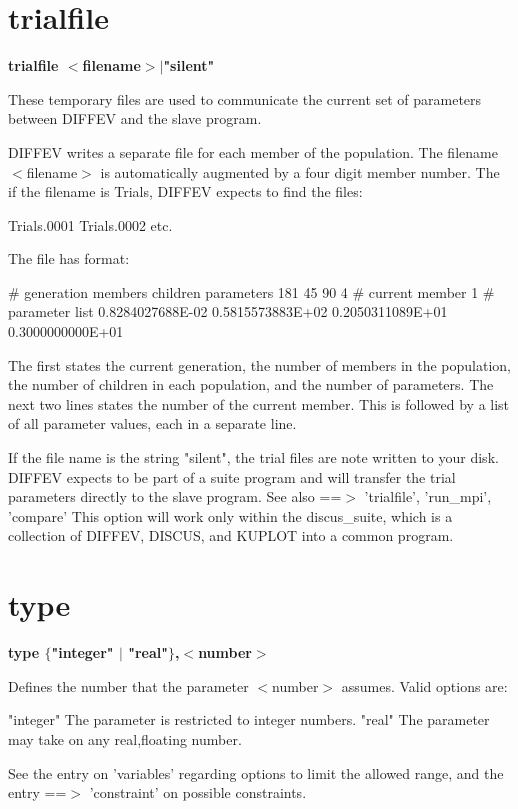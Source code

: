 \section{trialfile}
{\bf trialfile $ <$filename$> $$| $"silent" \par }
\par
\vspace{3pt}
These temporary files are used to communicate the current set of parameters 
between DIFFEV and the slave program. 
\par
DIFFEV writes a separate file for each member of the population. 
The filename $ <$filename$> $ is automatically augmented by a four digit 
member number. The if the filename is Trials, DIFFEV expects to 
find the files: 
\begin{MacVerbatim}
Trials.0001
Trials.0002
etc.
\end{MacVerbatim}
The file has format: 
\par
\begin{MacVerbatim}
# generation members children parameters
     181        45        90         4
# current member
    1
# parameter list
    0.8284027688E-02
    0.5815573883E+02
    0.2050311089E+01
    0.3000000000E+01
\end{MacVerbatim}
The first states the current generation, the number of members in 
the population, the number of children in each population, and the 
number of parameters. 
The next two lines states the number of the current member. 
This is followed by a list of all parameter values, each in a separate 
line. 
\par
If the file name is the string "silent", the trial files are 
note written to your disk. DIFFEV expects to be part of a suite 
program and will transfer the trial parameters directly to the 
slave program. See also ==$> $ 'trialfile', 'run\_mpi', 'compare' 
This option will work only within the discus\_suite, which is a 
collection of DIFFEV, DISCUS, and KUPLOT into a common program. 
\section{type}
{\bf type $ \{$"integer" $| $ "real"$\} $,$ <$number$> $ \par }
\par
\vspace{3pt}
Defines the number that the parameter $ <$number$> $ assumes. Valid options 
are: 
\begin{MacVerbatim}
"integer" The parameter is restricted to integer numbers.
"real"    The parameter may take on any real,floating number.
\end{MacVerbatim}
See the entry on 'variables' regarding options to limit the allowed range, 
and the entry ==$> $ 'constraint' on possible constraints. 
